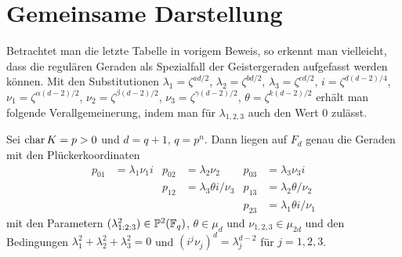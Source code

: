 \section{Gemeinsame Darstellung}
Betrachtet man die letzte Tabelle in vorigem Beweis, so erkennt man vielleicht, dass die regulären Geraden als Spezialfall der Geistergeraden aufgefasst werden können. Mit den Substitutionen $\lambda_1 = \zeta^{ad/2}$, $\lambda_2 = \zeta^{bd/2}$, $\lambda_3 = \zeta^{cd/2}$, $i = \zeta^{d(d-2)/4}$, $\nu_1 = \zeta^{\alpha(d-2)/2}$, $\nu_2 = \zeta^{\beta(d-2)/2}$, $\nu_3 = \zeta^{\gamma(d-2)/2}$, $\theta = \zeta^{k(d-2)/2}$ erhält man folgende Verallgemeinerung, indem man für $\lambda_{1,2,3}$ auch den Wert $0$ zulässt.
\begin{coroll}
Sei $\operatorname{char} K = p > 0$ und $d = q+1$, $q = p^n$. Dann liegen auf $F_d$ genau die Geraden mit den Plückerkoordinaten
\begin{align*}
p_{01} &= \lambda_1 \nu_1 i &p_{02} &= \lambda_2 \nu_2 &p_{03} &= \lambda_3 \nu_3 i \\
 & &p_{12} &= \lambda_3 \theta i / \nu_3 &p_{13} &= \lambda_2 \theta / \nu_2 \\
 & & & &p_{23} &= \lambda_1 \theta i / \nu_1
\end{align*}
mit den Parametern $(\lambda_{1:2:3}^2) \in \mathbb P^{2}(\mathbb F_q)$, $\theta \in \mu_d$ und $\nu_{1,2,3} \in \mu_{2d}$ und den Bedingungen $\lambda_1^2 + \lambda_2^2 + \lambda_3^2 = 0$ und $(i^j \nu_j)^d = \lambda_j^{d-2}$ für $j=1,2,3$.
\end{coroll}
